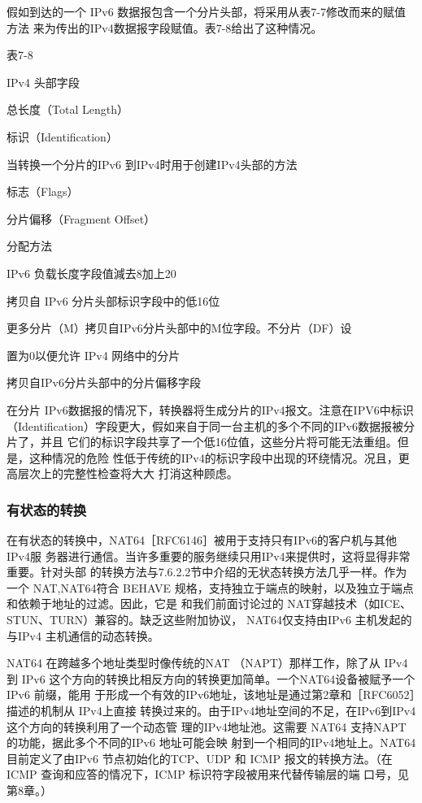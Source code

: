 假如到达的一个 IPv6 数据报包含一个分片头部，将采用从表7-7修改而来的赋值方法
来为传出的IPv4数据报字段赋值。表7-8给出了这种情况。

表7-8

IPv4 头部字段

总长度（Total Length）

标识（Identification）

当转换一个分片的IPv6 到IPv4时用于创建IPv4头部的方法

标志（Flags）

分片偏移（Fragment Offset）

分配方法

IPv6 负载长度字段值減去8加上20

拷贝自 IPv6 分片头部标识字段中的低16位

更多分片（M）拷贝自IPv6分片头部中的M位字段。不分片（DF）设

置为0以便允许 IPv4 网络中的分片

拷贝自IPv6分片头部中的分片偏移字段

在分片 IPv6数据报的情况下，转换器将生成分片的IPv4报文。注意在IPV6中标识
（Identification）字段更大，假如来自于同一台主机的多个不同的IPv6数据报被分片了，并且
它们的标识字段共享了一个低16位值，这些分片将可能无法重组。但是，这种情况的危险
性低于传统的IPv4的标识字段中出现的环绕情况。况且，更高层次上的完整性检查将大大
打消这种顾虑。

\subsubsection{有状态的转换}

在有状态的转换中，NAT64［RFC6146］被用于支持只有IPv6的客户机与其他IPv4服
务器进行通信。当许多重要的服务继续只用IPv4来提供时，这将显得非常重要。针对头部
的转换方法与7.6.2.2节中介绍的无状态转换方法几乎一样。作为一个 NAT,NAT64符合
BEHAVE 规格，支持独立于端点的映射，以及独立于端点和依赖于地址的过滤。因此，它是
和我们前面讨论过的 NAT穿越技术（如ICE、STUN、TURN）兼容的。缺乏这些附加协议，
NAT64仅支持由IPv6 主机发起的与IPv4 主机通信的动态转换。

NAT64 在跨越多个地址类型时像传统的NAT （NAPT）那样工作，除了从 IPv4到 IPv6
这个方向的转换比相反方向的转换更加简单。一个NAT64设备被赋予一个 IPv6 前缀，能用
于形成一个有效的IPv6地址，该地址是通过第2章和［RFC6052］描述的机制从 IPv4上直接
转换过来的。由于IPv4地址空间的不足，在IPv6到IPv4这个方向的转换利用了一个动态管
理的IPv4地址池。这需要 NAT64 支持NAPT的功能，据此多个不同的IPv6 地址可能会映
射到一个相同的IPv4地址上。NAT64目前定义了由IPv6 节点初始化的TCP、UDP 和 ICMP
报文的转换方法。（在ICMP 查询和应答的情况下，ICMP 标识符字段被用来代替传输层的端
口号，见第8章。）


